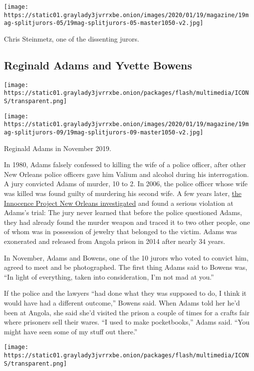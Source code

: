\texttt{[image: https://static01.graylady3jvrrxbe.onion/images/2020/01/19/magazine/19mag-splitjurors-05/19mag-splitjurors-05-master1050-v2.jpg]}

Chris Steinmetz, one of the dissenting jurors.

\hypertarget{reginald-adams-and-yvette-bowens}{%
\subsection{Reginald Adams and Yvette
Bowens}\label{reginald-adams-and-yvette-bowens}}

\texttt{[image: https://static01.graylady3jvrrxbe.onion/packages/flash/multimedia/ICONS/transparent.png]}

\texttt{[image: https://static01.graylady3jvrrxbe.onion/images/2020/01/19/magazine/19mag-splitjurors-09/19mag-splitjurors-09-master1050-v2.jpg]}

Reginald Adams in November 2019.

In 1980, Adams falsely confessed to killing the wife of a police
officer, after other New Orleans police officers gave him Valium and
alcohol during his interrogation. A jury convicted Adams of murder, 10
to 2. In 2006, the police officer whose wife was killed was found guilty
of murdering his second wife. A few years later,
\href{https://ip-no.org/what-we-do/free-innocent-prisoners/client-profiles/reginald-adams/}{the
Innocence Project New Orleans investigated} and found a serious
violation at Adams's trial: The jury never learned that before the
police questioned Adams, they had already found the murder weapon and
traced it to two other people, one of whom was in possession of jewelry
that belonged to the victim. Adams was exonerated and released from
Angola prison in 2014 after nearly 34 years.

In November, Adams and Bowens, one of the 10 jurors who voted to convict
him, agreed to meet and be photographed. The first thing Adams said to
Bowens was, ``In light of everything, taken into consideration, I'm not
mad at you.''

If the police and the lawyers ``had done what they was supposed to do, I
think it would have had a different outcome,'' Bowens said. When Adams
told her he'd been at Angola, she said she'd visited the prison a couple
of times for a crafts fair where prisoners sell their wares. ``I used to
make pocketbooks,'' Adams said. ``You might have seen some of my stuff
out there.''

\texttt{[image: https://static01.graylady3jvrrxbe.onion/packages/flash/multimedia/ICONS/transparent.png]}

